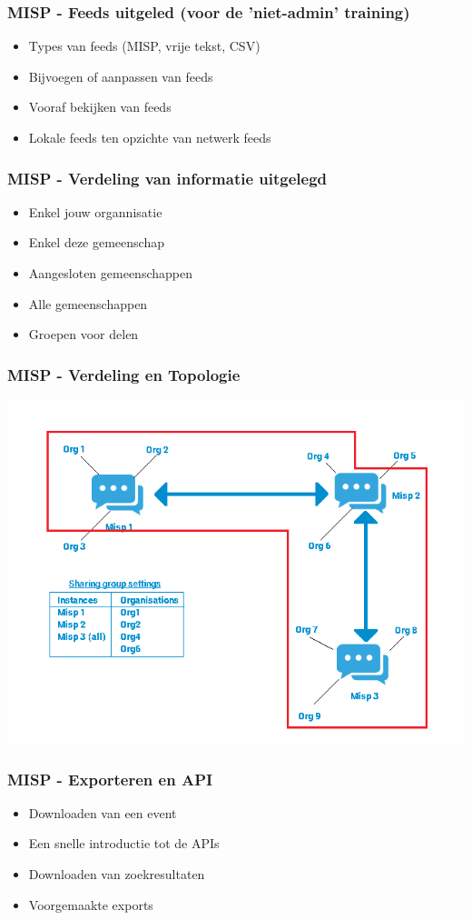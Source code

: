 \begin{frame}
    \frametitle{MISP - Feeds uitgeled (voor de 'niet-admin' training)}
    \begin{itemize}
        \item Types van feeds (MISP, vrije tekst, CSV)
        \item Bijvoegen of aanpassen van feeds
        \item Vooraf bekijken van feeds
        \item Lokale feeds ten opzichte van netwerk feeds
    \end{itemize}
\end{frame}

\begin{frame}
    \frametitle{MISP - Verdeling van informatie uitgelegd}
    \begin{itemize}
        \item Enkel jouw organnisatie
        \item Enkel deze gemeenschap
        \item Aangesloten gemeenschappen
        \item Alle gemeenschappen
        \item Groepen voor delen
    \end{itemize}
\end{frame}

\begin{frame}
    \frametitle{MISP - Verdeling en Topologie}
    \includegraphics[scale=0.45]{screenshots/sync.png}
\end{frame}

\begin{frame}
    \frametitle{MISP - Exporteren en API}
    \begin{itemize}
        \item Downloaden van een event
        \item Een snelle introductie tot de APIs
        \item Downloaden van zoekresultaten
        \item Voorgemaakte exports
    \end{itemize}
\end{frame}

